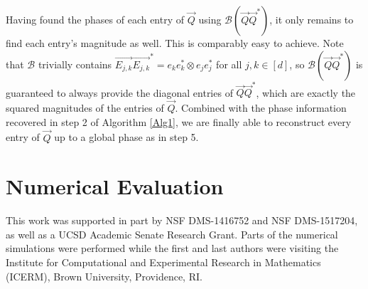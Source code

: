 \documentclass[]{spie}  %
\def \vec{\overrightarrow}
\def \B {\mathcal{B}}
\begin{document}
Having found the phases of each entry of $\vec{Q}$ using $\B ( \vec{Q} \vec{Q}^* )$, it only remains to find each entry's magnitude as well.  This is comparably easy to achieve.  Note that $\B$ trivially contains $\vec{E_{j,k}}\vec{E_{j,k}}^* = e_ke_k^* \otimes e_je_j^*$ for all $j, k \in [d]$, so $\B ( \vec{Q} \vec{Q}^* )$ is guaranteed to always provide the diagonal entries of $\vec{Q} \vec{Q}^*$, which are exactly the squared magnitudes of the entries of $\vec{Q}$.  Combined with the phase information recovered in step 2 of Algorithm \ref{Alg1}, we are finally able to reconstruct every entry of $\vec{Q}$ up to a global phase as in step 5.


\section{Numerical Evaluation}
\label{sec:Numerics}



\acknowledgments %
 
This work was supported in part by NSF DMS-1416752 and NSF DMS-1517204, as well as a UCSD  Academic Senate Research Grant. %
Parts of the numerical simulations were performed while the first and last authors were visiting the 
Institute for Computational and Experimental Research in Mathematics (ICERM), Brown University,
Providence, RI.

\end{document}
